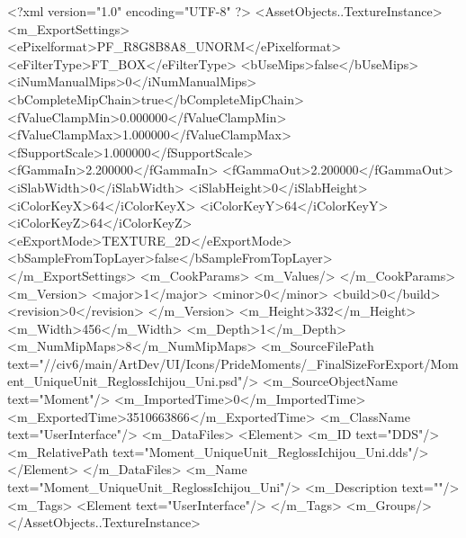 <?xml version="1.0" encoding="UTF-8" ?>
<AssetObjects..TextureInstance>
	<m_ExportSettings>
		<ePixelformat>PF_R8G8B8A8_UNORM</ePixelformat>
		<eFilterType>FT_BOX</eFilterType>
		<bUseMips>false</bUseMips>
		<iNumManualMips>0</iNumManualMips>
		<bCompleteMipChain>true</bCompleteMipChain>
		<fValueClampMin>0.000000</fValueClampMin>
		<fValueClampMax>1.000000</fValueClampMax>
		<fSupportScale>1.000000</fSupportScale>
		<fGammaIn>2.200000</fGammaIn>
		<fGammaOut>2.200000</fGammaOut>
		<iSlabWidth>0</iSlabWidth>
		<iSlabHeight>0</iSlabHeight>
		<iColorKeyX>64</iColorKeyX>
		<iColorKeyY>64</iColorKeyY>
		<iColorKeyZ>64</iColorKeyZ>
		<eExportMode>TEXTURE_2D</eExportMode>
		<bSampleFromTopLayer>false</bSampleFromTopLayer>
	</m_ExportSettings>
	<m_CookParams>
		<m_Values/>
	</m_CookParams>
	<m_Version>
		<major>1</major>
		<minor>0</minor>
		<build>0</build>
		<revision>0</revision>
	</m_Version>
	<m_Height>332</m_Height>
	<m_Width>456</m_Width>
	<m_Depth>1</m_Depth>
	<m_NumMipMaps>8</m_NumMipMaps>
	<m_SourceFilePath text="//civ6/main/ArtDev/UI/Icons/PrideMoments/_FinalSizeForExport/Moment_UniqueUnit_ReglossIchijou_Uni.psd"/>
	<m_SourceObjectName text="Moment"/>
	<m_ImportedTime>0</m_ImportedTime>
	<m_ExportedTime>3510663866</m_ExportedTime>
	<m_ClassName text="UserInterface"/>
	<m_DataFiles>
		<Element>
			<m_ID text="DDS"/>
			<m_RelativePath text="Moment_UniqueUnit_ReglossIchijou_Uni.dds"/>
		</Element>
	</m_DataFiles>
	<m_Name text="Moment_UniqueUnit_ReglossIchijou_Uni"/>
	<m_Description text=""/>
	<m_Tags>
		<Element text="UserInterface"/>
	</m_Tags>
	<m_Groups/>
</AssetObjects..TextureInstance>

